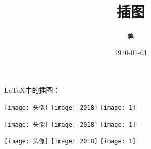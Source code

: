 \documentclass{article}
\title{插图}
\author{勇}
\date{\today}
\begin{document}
	\maketitle
	
	\LaTeX{}中的插图：
	
	\texttt{[image: 头像]}
	\texttt{[image: 2018]}
	\texttt{[image: 1]}
	
	\texttt{[image: 头像]}
	\texttt{[image: 2018]}
	\texttt{[image: 1]}
	
	\texttt{[image: 头像]}
	\texttt{[image: 2018]}
	\texttt{[image: 1]}
\end{document}
